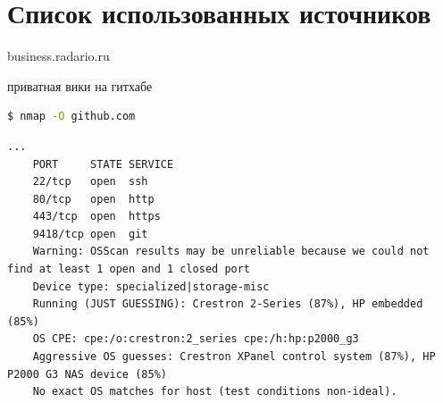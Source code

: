\documentclass{article}
\begin{document}


\pagebreak

\section{Список использованных источников}

business.radario.ru

приватная вики на гитхабе


\begin{lstlisting}[language=bash, basicstyle=\ttfamily\small]
    $ nmap -O github.com
\end{lstlisting}
\begin{lstlisting}[frame=lines, basicstyle=\ttfamily\small]
    ...
    PORT     STATE SERVICE
    22/tcp   open  ssh
    80/tcp   open  http
    443/tcp  open  https
    9418/tcp open  git
    Warning: OSScan results may be unreliable because we could not find at least 1 open and 1 closed port
    Device type: specialized|storage-misc
    Running (JUST GUESSING): Crestron 2-Series (87%), HP embedded (85%)
    OS CPE: cpe:/o:crestron:2_series cpe:/h:hp:p2000_g3
    Aggressive OS guesses: Crestron XPanel control system (87%), HP P2000 G3 NAS device (85%)
    No exact OS matches for host (test conditions non-ideal).
\end{lstlisting}
\end{document}

